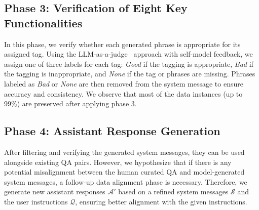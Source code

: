 

\subsection{Phase 3: Verification of Eight Key Functionalities}
\label{sysgen:verification}
In this phase, we verify whether each generated phrase is appropriate for its assigned tag. 
Using the LLM-as-a-judge~\citep{zheng2023judging} approach with self-model feedback, we assign one of three labels for each tag: \textit{Good} if the tagging is appropriate, \textit{Bad} if the tagging is inappropriate, and \textit{None} if the tag or phrases are missing.
Phrases labeled as \textit{Bad} or \textit{None} are then removed from the system message to ensure accuracy and consistency.
We observe that most of the data instances (up to 99\%) are preserved after applying phase 3.


\subsection{Phase 4: Assistant Response Generation}
\label{sysgen:answer_generation}
After filtering and verifying the generated system messages, they can be used alongside existing QA pairs.
However, we hypothesize that if there is any potential misalignment between the human curated QA and model-generated system messages, a follow-up data alignment phase is necessary.
Therefore, we generate new assistant responses $\mathcal{A'}$ based on a refined system messages $\mathcal{S}$ and the user instructions $\mathcal{Q}$, ensuring better alignment with the given instructions.

